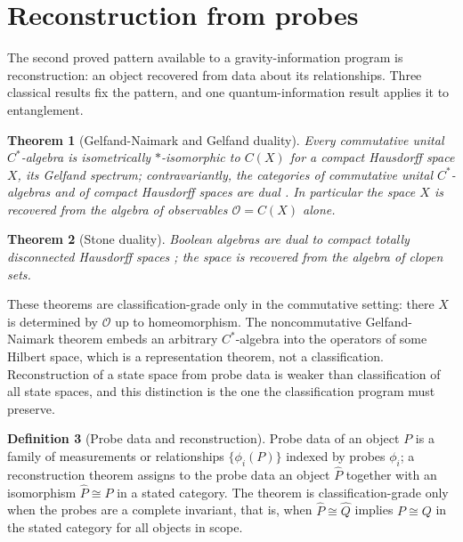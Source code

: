 \documentclass[11pt,letterpaper]{article}
\newtheorem{theorem}{Theorem}[section]
\theoremstyle{definition}
\newtheorem{definition}[theorem]{Definition}
\theoremstyle{remark}
\begin{document}
\section{Reconstruction from probes}
\label{sec:reconstruction}

The second proved pattern available to a gravity-information program is reconstruction: an object recovered from data about its relationships. Three classical results fix the pattern, and one quantum-information result applies it to entanglement.

\begin{theorem}[Gelfand-Naimark and Gelfand duality]
\label{thm:gelfand}
Every commutative unital $C^*$-algebra is isometrically $*$-isomorphic to $C(X)$ for a compact Hausdorff space $X$, its Gelfand spectrum; contravariantly, the categories of commutative unital $C^*$-algebras and of compact Hausdorff spaces are dual \cite{gn}. In particular the space $X$ is recovered from the algebra of observables $\mathcal{O} = C(X)$ alone.
\end{theorem}

\begin{theorem}[Stone duality]
\label{thm:stone}
Boolean algebras are dual to compact totally disconnected Hausdorff spaces \cite{stone}; the space is recovered from the algebra of clopen sets.
\end{theorem}

These theorems are classification-grade only in the commutative setting: there $X$ is determined by $\mathcal{O}$ up to homeomorphism. The noncommutative Gelfand-Naimark theorem embeds an arbitrary $C^*$-algebra into the operators of some Hilbert space, which is a representation theorem, not a classification. Reconstruction of a state space from probe data is weaker than classification of all state spaces, and this distinction is the one the classification program must preserve.

\begin{definition}[Probe data and reconstruction]
\label{def:probe}
Probe data of an object $P$ is a family of measurements or relationships $\{\phi_i(P)\}$ indexed by probes $\phi_i$; a reconstruction theorem assigns to the probe data an object $\hat{P}$ together with an isomorphism $\hat{P} \cong P$ in a stated category. The theorem is classification-grade only when the probes are a complete invariant, that is, when $\hat{P} \cong \hat{Q}$ implies $P \cong Q$ in the stated category for all objects in scope.
\end{definition}
\end{document}
